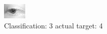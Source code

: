 \begin{figure}[h!]
\begin{center}
\includegraphics[width=0.60\columnwidth]{figures/ID2594_class_3_target_4.png}
\end{center}
\caption{ Classification: 3 actual target: 4}
\label{fig:ID2594_class_3_target_4}
\end{figure}
